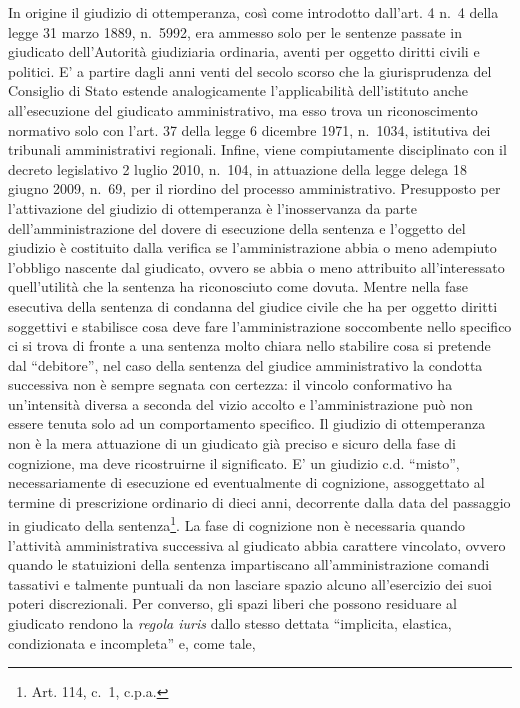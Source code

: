\documentclass[12pt,it,a4paper,]{report}
\begin{document}
In origine il giudizio di ottemperanza, così come introdotto dall'art. 4
n.~4 della legge 31 marzo 1889, n.~5992, era ammesso solo per le
sentenze passate in giudicato dell'Autorità giudiziaria ordinaria,
aventi per oggetto diritti civili e politici. E' a partire dagli anni
venti del secolo scorso che la giurisprudenza del Consiglio di Stato
estende analogicamente l'applicabilità dell'istituto anche
all'esecuzione del giudicato amministrativo, ma esso trova un
riconoscimento normativo solo con l'art. 37 della legge 6 dicembre 1971,
n.~1034, istitutiva dei tribunali amministrativi regionali. Infine,
viene compiutamente disciplinato con il decreto legislativo 2 luglio
2010, n.~104, in attuazione della legge delega 18 giugno 2009, n.~69,
per il riordino del processo amministrativo. Presupposto per
l'attivazione del giudizio di ottemperanza è l'inosservanza da parte
dell'amministrazione del dovere di esecuzione della sentenza e l'oggetto
del giudizio è costituito dalla verifica se l'amministrazione abbia o
meno adempiuto l'obbligo nascente dal giudicato, ovvero se abbia o meno
attribuito all'interessato quell'utilità che la sentenza ha riconosciuto
come dovuta. Mentre nella fase esecutiva della sentenza di condanna del
giudice civile che ha per oggetto diritti soggettivi e stabilisce cosa
deve fare l'amministrazione soccombente nello specifico ci si trova di
fronte a una sentenza molto chiara nello stabilire cosa si pretende dal
``debitore'', nel caso della sentenza del giudice amministrativo la
condotta successiva non è sempre segnata con certezza: il vincolo
conformativo ha un'intensità diversa a seconda del vizio accolto e
l'amministrazione può non essere tenuta solo ad un comportamento
specifico. Il giudizio di ottemperanza non è la mera attuazione di un
giudicato già preciso e sicuro della fase di cognizione, ma deve
ricostruirne il significato. E' un giudizio c.d. ``misto'',
necessariamente di esecuzione ed eventualmente di cognizione,
assoggettato al termine di prescrizione ordinario di dieci anni,
decorrente dalla data del passaggio in giudicato della
sentenza\footnote{Art. 114, c.~1, c.p.a.}. La fase di cognizione non è
necessaria quando l'attività amministrativa successiva al giudicato
abbia carattere vincolato, ovvero quando le statuizioni della sentenza
impartiscano all'amministrazione comandi tassativi e talmente puntuali
da non lasciare spazio alcuno all'esercizio dei suoi poteri
discrezionali. Per converso, gli spazi liberi che possono residuare al
giudicato rendono la \emph{regola iuris} dallo stesso dettata
``implicita, elastica, condizionata e incompleta'' e, come tale,
\end{document}
